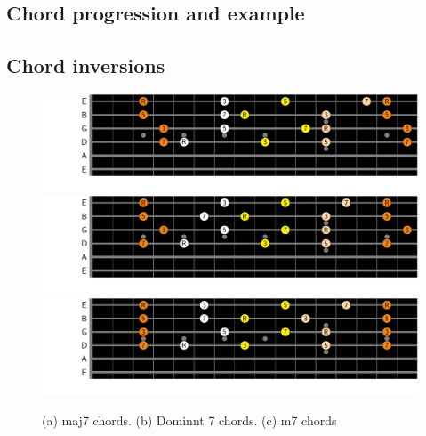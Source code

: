 \documentclass{article}
\begin{document}
\newpage
\subsection{Chord progression and example}



\newpage
\subsection{Chord inversions}

\begin{figure}[h!]
	\centering
	\hspace*{-2.2cm}
	\includegraphics[scale=0.7, trim= {0cm 0cm 0cm 0cm}, clip]{figures/chord-inversions/maj7.pdf}
	\hspace*{-2.2cm}
	\includegraphics[scale=0.7, trim= {0cm 0cm 0cm 0cm}, clip]{figures/chord-inversions/Dominant7.pdf}
	\hspace*{-2.2cm}
	\includegraphics[scale=0.7, trim= {0cm 0cm 0cm 0cm}, clip]{figures/chord-inversions/m7.pdf}
	\caption{(a) maj7 chords. (b) Dominnt 7 chords. (c) m7 chords  }
	\label{fig}
\end{figure}

\end{document}
